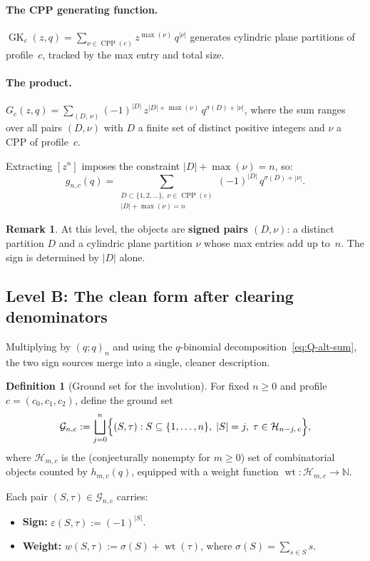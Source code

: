 \documentclass[11pt]{article}
\newcommand{\N}{\mathbb{N}}
\newcommand{\GK}{\operatorname{GK}}
\newcommand{\CPP}{\operatorname{CPP}}
\newcommand{\qpochn}[3]{(#1;#2)_{#3}}
\theoremstyle{plain}
\theoremstyle{definition}
\newtheorem{definition}[theorem]{Definition}
\newtheorem{remark}[theorem]{Remark}
\begin{document}
\paragraph{The CPP generating function.}
$\GK_c(z,q) = \sum_{\nu \in \CPP(c)} z^{\max(\nu)}\, q^{|\nu|}$
generates cylindric plane partitions of profile~$c$, tracked by
the max entry and total size.

\paragraph{The product.}
$G_c(z,q) = \sum_{(D,\,\nu)} (-1)^{|D|}\, z^{|D|+\max(\nu)}\,
q^{\sigma(D)+|\nu|}$,
where the sum ranges over all pairs $(D, \nu)$ with $D$ a finite
set of distinct positive integers and $\nu$ a CPP of profile~$c$.

Extracting $[z^n]$ imposes the constraint $|D| + \max(\nu) = n$,
so:
\begin{equation}\label{eq:gn-pairs}
  g_{n,c}(q)
  = \sum_{\substack{D \subset \{1,2,\ldots\},\; \nu \in \CPP(c) \\
  |D| + \max(\nu) = n}}
  (-1)^{|D|}\, q^{\sigma(D) + |\nu|}.
\end{equation}

\begin{remark}
At this level, the objects are \textbf{signed pairs $(D, \nu)$}:
a distinct partition $D$ and a cylindric plane partition $\nu$
whose max entries add up to~$n$.  The sign is determined by
$|D|$ alone.
\end{remark}


\subsection{Level B: The clean form after clearing denominators}

Multiplying by $\qpochn{q}{q}{n}$ and using the $q$-binomial
decomposition~\eqref{eq:Q-alt-sum}, the two sign sources merge
into a single, cleaner description.

\begin{definition}[Ground set for the involution]
\label{def:ground-set}
For fixed $n \geq 0$ and profile $c = (c_0, c_1, c_2)$, define
the ground set
\[
  \mathcal{G}_{n,c} :=
  \bigsqcup_{j=0}^{n}
  \Bigl\{(S, \tau) :
    S \subseteq \{1, \ldots, n\},\; |S| = j,\;
    \tau \in \mathcal{H}_{n-j,\,c}
  \Bigr\},
\]
where $\mathcal{H}_{m,c}$ is the (conjecturally nonempty for $m \geq 0$)
set of combinatorial objects counted by $h_{m,c}(q)$, equipped with a
weight function $\operatorname{wt}\colon \mathcal{H}_{m,c} \to \N$.

Each pair $(S, \tau) \in \mathcal{G}_{n,c}$ carries:
\begin{itemize}
  \item \textbf{Sign:} $\varepsilon(S, \tau) := (-1)^{|S|}$.
  \item \textbf{Weight:} $w(S, \tau) := \sigma(S) + \operatorname{wt}(\tau)$,
    where $\sigma(S) = \sum_{s \in S} s$.
\end{itemize}
\end{definition}
\end{document}
